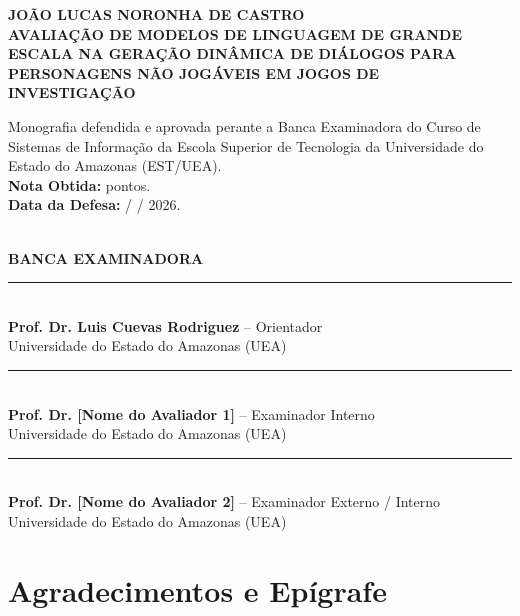 \documentclass[12pt,a4paper,oneside]{report}
\begin{document}
\newpage
\begin{center}
    {\large \textbf{JOÃO LUCAS NORONHA DE CASTRO}}\\[1.5cm]

    {\large \textbf{AVALIAÇÃO DE MODELOS DE LINGUAGEM DE GRANDE ESCALA NA GERAÇÃO DINÂMICA DE DIÁLOGOS PARA PERSONAGENS NÃO JOGÁVEIS EM JOGOS DE INVESTIGAÇÃO}}\\[1.5cm]

    \hfill
    \begin{minipage}{0.55\textwidth}
        \linespread{1.1}\selectfont
        \small
        Monografia defendida e aprovada perante a Banca Examinadora do Curso de Sistemas de Informação da Escola Superior de Tecnologia da Universidade do Estado do Amazonas (EST/UEA).\\[0.3cm]
        \textbf{Nota Obtida:} \underline{\hspace{2.5cm}} pontos.\\[0.3cm]
        \textbf{Data da Defesa:} \underline{\hspace{1cm}} / \underline{\hspace{1cm}} / 2026.
    \end{minipage}\\[1.5cm]

    \textbf{BANCA EXAMINADORA}\\[1.5cm]

    \rule{0.75\textwidth}{0.5pt}\\
    \textbf{Prof. Dr. Luis Cuevas Rodriguez} -- Orientador\\
    Universidade do Estado do Amazonas (UEA)\\[1.2cm]

    \rule{0.75\textwidth}{0.5pt}\\
    \textbf{Prof. Dr. [Nome do Avaliador 1]} -- Examinador Interno\\
    Universidade do Estado do Amazonas (UEA)\\[1.2cm]

    \rule{0.75\textwidth}{0.5pt}\\
    \textbf{Prof. Dr. [Nome do Avaliador 2]} -- Examinador Externo / Interno\\
    Universidade do Estado do Amazonas (UEA)
\end{center}

\newpage
\chapter*{Agradecimentos e Epígrafe}
\end{document}
